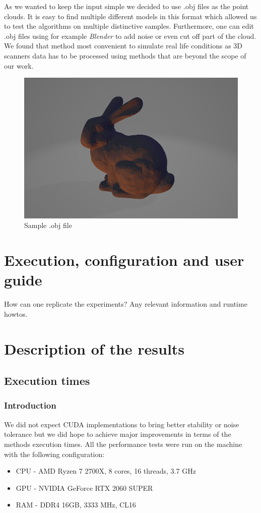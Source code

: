 \documentclass[titlepage]{article}
\begin{document}
As we wanted to keep the input simple we decided to use .obj files as the point clouds. It is easy to find multiple different models in this format which allowed us to test the algorithms on multiple distinctive samples. Furthermore, one can edit .obj files using for example \textit{Blender} to add noise or even cut off part of the cloud. We found that method most convenient to simulate real life conditions as 3D scanners data has to be processed using methods that are beyond the scope of our work.

\begin{figure}[H]
\includegraphics[width=\textwidth]{ms-bunny.png}
\caption{Sample .obj file}
\end{figure}

\section{Execution, configuration and user guide}
How can one replicate the experiments?
Any relevant information and runtime howtos.

\section{Description of the results}

\subsection{Execution times}
\subsubsection{Introduction}
We did not expect CUDA implementations to bring better stability or noise tolerance but we did hope to achieve major improvements in terms of the methods execution times. All the performance tests were run on the machine with the following configuration:
\begin{itemize}
\item CPU - AMD Ryzen 7 2700X, 8 cores, 16 threads, 3.7 GHz
\item GPU - NVIDIA GeForce RTX 2060 SUPER
\item RAM - DDR4 16GB, 3333 MHz, CL16
\end{itemize}
\end{document}
